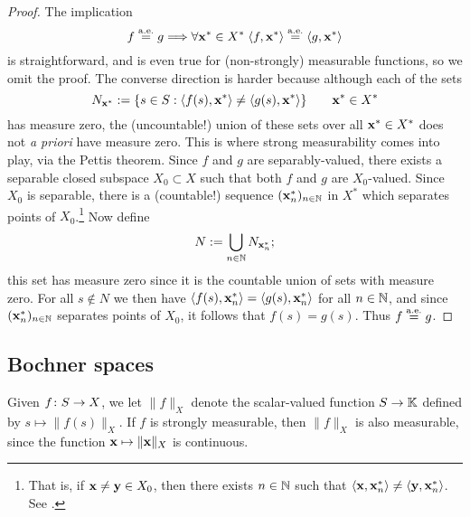 \begin{proof}
  The implication
  \begin{equation*}
    f \stackrel{\mathrm{a.e.}}{=}g \Longrightarrow \forall \mathbf{x}^* \in X^* \;  \langle f, \mathbf{x}^* \rangle \stackrel{\mathrm{a.e.}}{=} \langle g, \mathbf{x}^* \rangle
  \end{equation*}
  is straightforward, and is even true for (non-strongly) measurable functions, so we omit the proof.
  The converse direction is harder because although each of the sets
  \begin{equation*}
    N_{\mathbf{x}^*} := \{s \in S : \langle f(s), \mathbf{x}^* \rangle \neq \langle g(s), \mathbf{x}^* \rangle\} \qquad \mathbf{x}^* \in X^*
  \end{equation*}
  has measure zero, the (uncountable!) union of these sets over all $\mathbf{x}^* \in X^*$ does not \emph{a priori} have measure zero.
  This is where strong measurability comes into play, via the Pettis theorem.
  Since $f$ and $g$ are separably-valued, there exists a separable closed subspace $X_0 \subset X$ such that both $f$ and $g$ are $X_0$-valued.
  Since $X_0$ is separable, there is a (countable!) sequence $(\mathbf{x}_n^*)_{n \in \mathbb{N}}$ in $X^*$ which separates points of $X_0$.\footnote{That is, if $\mathbf{x} \neq \mathbf{y} \in X_0$, then there exists $n \in \mathbb{N}$ such that $\langle \mathbf{x}, \mathbf{x}_n^* \rangle \neq \langle \mathbf{y}, \mathbf{x}_n^* \rangle$. See \cite[Proposition B.1.11]{HNVW16}.}
  Now define
  \begin{equation*}
    N := \bigcup_{n \in \mathbb{N}} N_{\mathbf{x}_n^*};
  \end{equation*}
  this set has measure zero since it is the countable union of sets with measure zero.
  For all $s \notin N$ we then have $\langle f(s), \mathbf{x}_n^* \rangle = \langle g(s), \mathbf{x}_n^* \rangle$ for all $n \in \mathbb{N}$, and since $(\mathbf{x}_n^*)_{n \in \mathbb{N}}$ separates points of $X_0$, it follows that $f(s) = g(s)$.
  Thus $f \stackrel{\mathrm{a.e.}}{=} g$.  
\end{proof}



\subsection{Bochner spaces}

Given $f \colon S \rightarrow X$, we let $\|f\|_X$ denote the scalar-valued function $S \to \mathbb{K}$ defined by $s \mapsto \|f(s)\|_X$.
If $f$ is strongly measurable, then $\|f\|_X$ is also measurable, since the function $\mathbf{x} \mapsto \|\mathbf{x}\|_X$ is continuous.

